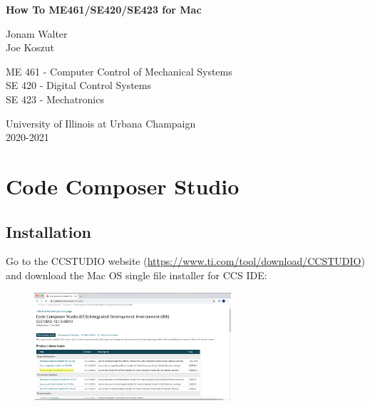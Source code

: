 \documentclass{article}
\begin{document}
\begin{titlepage}
   \begin{center}
       \vspace*{1cm}
 
       \Large{\textbf{How To ME461/SE420/SE423 for Mac}}
 
       \vspace{0.5cm}
        Jonam Walter \\
        Joe Koszut
 
       \vfill
 
       ME 461 - Computer Control of Mechanical Systems \\
       SE 420 - Digital Control Systems \\
       SE 423 - Mechatronics
 
       \vspace{2cm}
 
       University of Illinois at Urbana Champaign\\
       2020-2021\\
 
   \end{center}
\end{titlepage}

\section{Code Composer Studio}

\subsection{Installation}

Go to the CCSTUDIO website (\url{https://www.ti.com/tool/download/CCSTUDIO}) and download the Mac OS single file installer for CCS IDE:

\begin{figure}[H]
    \centering
  \includegraphics[width = 0.65\textwidth]{ccs_install_1} 
\end{figure}
\end{document}
